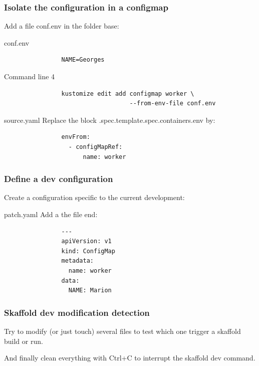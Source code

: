 	\begin{frame}[fragile]
		\frametitle{Isolate the configuration in a configmap}

		Add a file conf.env in the folder base:
		\begin{block}{conf.env}
			\begin{verbatim}
				NAME=Georges
			\end{verbatim}
		\end{block}				
		
		\begin{block}{Command line 4}
			\begin{verbatim}
				kustomize edit add configmap worker \
				                   --from-env-file conf.env
			\end{verbatim}
		\end{block}
		
		\begin{block}{source.yaml}
			Replace the block .spec.template.spec.containers.env by:
			\begin{verbatim}
				envFrom:
				  - configMapRef:
				      name: worker
			\end{verbatim}
		\end{block}
	\end{frame}
	
	\begin{frame}[fragile]
		\frametitle{Define a dev configuration}
		
		Create a configuration specific to the current development:
		\begin{block}{patch.yaml}
			Add a the file end:
			\begin{verbatim}
				---
				apiVersion: v1
				kind: ConfigMap
				metadata:
				  name: worker
				data:
				  NAME: Marion
			\end{verbatim}
		\end{block}
	\end{frame}
	
	\begin{frame}[fragile]
		\frametitle{Skaffold dev modification detection}
		
		Try to modify (or just touch) several files to test which one trigger a skaffold build or run.
		
		And finally clean everything with Ctrl+C to interrupt the skaffold dev command.
	\end{frame}